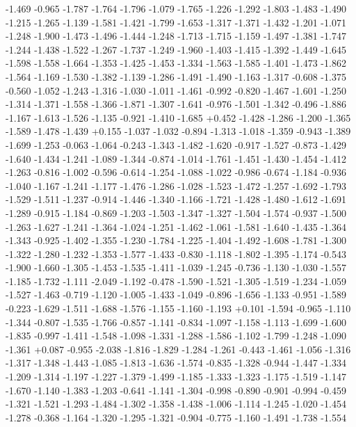 \documentclass[9pt]{article}
\theoremstyle{plain}
\theoremstyle{definition}
\theoremstyle{remark}
\numberwithin{equation}{section}
\begin{document}
-1.469
-0.965
-1.787
-1.764
-1.796
-1.079
-1.765
-1.226
-1.292
-1.803
-1.483
-1.490
-1.215
-1.265
-1.139
-1.581
-1.421
-1.799
-1.653
-1.317
-1.371
-1.432
-1.201
-1.071
-1.248
-1.900
-1.473
-1.496
-1.444
-1.248
-1.713
-1.715
-1.159
-1.497
-1.381
-1.747
-1.244
-1.438
-1.522
-1.267
-1.737
-1.249
-1.960
-1.403
-1.415
-1.392
-1.449
-1.645
-1.598
-1.558
-1.664
-1.353
-1.425
-1.453
-1.334
-1.563
-1.585
-1.401
-1.473
-1.862
-1.564
-1.169
-1.530
-1.382
-1.139
-1.286
-1.491
-1.490
-1.163
-1.317
-0.608
-1.375
-0.560
-1.052
-1.243
-1.316
-1.030
-1.011
-1.461
-0.992
-0.820
-1.467
-1.601
-1.250
-1.314
-1.371
-1.558
-1.366
-1.871
-1.307
-1.641
-0.976
-1.501
-1.342
-0.496
-1.886
-1.167
-1.613
-1.526
-1.135
-0.921
-1.410
-1.685
+0.452
-1.428
-1.286
-1.200
-1.365
-1.589
-1.478
-1.439
+0.155
-1.037
-1.032
-0.894
-1.313
-1.018
-1.359
-0.943
-1.389
-1.699
-1.253
-0.063
-1.064
-0.243
-1.343
-1.482
-1.620
-0.917
-1.527
-0.873
-1.429
-1.640
-1.434
-1.241
-1.089
-1.344
-0.874
-1.014
-1.761
-1.451
-1.430
-1.454
-1.412
-1.263
-0.816
-1.002
-0.596
-0.614
-1.254
-1.088
-1.022
-0.986
-0.674
-1.184
-0.936
-1.040
-1.167
-1.241
-1.177
-1.476
-1.286
-1.028
-1.523
-1.472
-1.257
-1.692
-1.793
-1.529
-1.511
-1.237
-0.914
-1.446
-1.340
-1.166
-1.721
-1.428
-1.480
-1.612
-1.691
-1.289
-0.915
-1.184
-0.869
-1.203
-1.503
-1.347
-1.327
-1.504
-1.574
-0.937
-1.500
-1.263
-1.627
-1.241
-1.364
-1.024
-1.251
-1.462
-1.061
-1.581
-1.640
-1.435
-1.364
-1.343
-0.925
-1.402
-1.355
-1.230
-1.784
-1.225
-1.404
-1.492
-1.608
-1.781
-1.300
-1.322
-1.280
-1.232
-1.353
-1.577
-1.433
-0.830
-1.118
-1.802
-1.395
-1.174
-0.543
-1.900
-1.660
-1.305
-1.453
-1.535
-1.411
-1.039
-1.245
-0.736
-1.130
-1.030
-1.557
-1.185
-1.732
-1.111
-2.049
-1.192
-0.478
-1.590
-1.521
-1.305
-1.519
-1.234
-1.059
-1.527
-1.463
-0.719
-1.120
-1.005
-1.433
-1.049
-0.896
-1.656
-1.133
-0.951
-1.589
-0.223
-1.629
-1.511
-1.688
-1.576
-1.155
-1.160
-1.193
+0.101
-1.594
-0.965
-1.110
-1.344
-0.807
-1.535
-1.766
-0.857
-1.141
-0.834
-1.097
-1.158
-1.113
-1.699
-1.600
-1.835
-0.997
-1.411
-1.548
-1.098
-1.331
-1.288
-1.586
-1.102
-1.799
-1.248
-1.090
-1.361
+0.087
-0.955
-2.038
-1.816
-1.829
-1.284
-1.261
-0.443
-1.461
-1.056
-1.316
-1.317
-1.348
-1.443
-1.085
-1.813
-1.636
-1.574
-0.835
-1.328
-0.944
-1.447
-1.334
-1.209
-1.314
-1.197
-1.227
-1.379
-1.499
-1.185
-1.333
-1.323
-1.175
-1.519
-1.147
-1.670
-1.140
-1.383
-1.203
-0.641
-1.141
-1.304
-0.998
-0.890
-0.901
-0.994
-0.459
-1.321
-1.521
-1.293
-1.484
-1.302
-1.358
-1.438
-1.006
-1.114
-1.245
-1.020
-1.454
-1.278
-0.368
-1.164
-1.320
-1.295
-1.321
-0.904
-0.775
-1.160
-1.491
-1.738
-1.554
\end{document}
